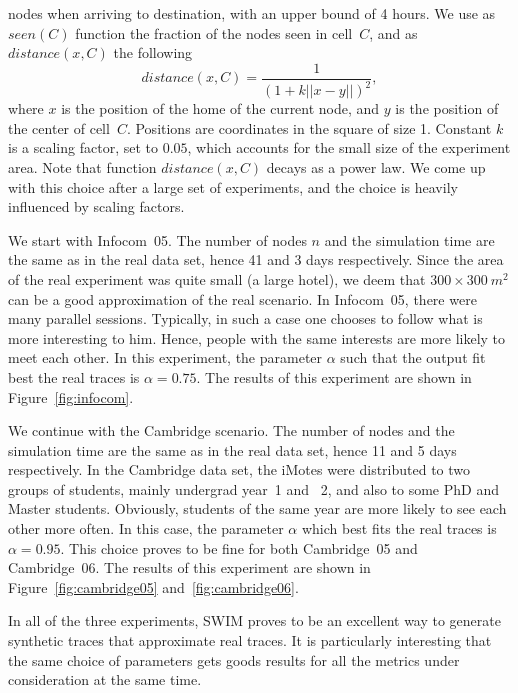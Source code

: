 \documentclass[conference]{IEEEtran}
\begin{document}
nodes when arriving to destination, with an upper bound of 4 hours. We use as
$\textit{seen}(C)$ function the fraction of the nodes seen in cell~$C$, and as
$\textit{distance}(x,C)$ the following
\begin{equation*}
\textit{distance}(x,C)=\frac{1}{\left(1+k||x-y||\right)^2},
\end{equation*}
where $x$ is the position of the home of the current node, and $y$ is the
position of the center of cell~$C$. Positions are coordinates in the square of
size 1. Constant $k$ is a scaling factor, set to $0.05$, which accounts for the
small size of the experiment area. Note that function $\textit{distance}(x,C)$
decays as a power law. We come up with this choice after a large set of
experiments, and the choice is heavily influenced by scaling factors.

We start with Infocom~05. The number of nodes $n$ and the simulation time are
the same as in the real data set, hence 41 and 3 days respectively. Since the
area of the real experiment was quite small (a large hotel), we deem that
$300\times300~m^2$ can be a good approximation of the real scenario. In
Infocom~05, there were many parallel sessions. Typically, in such a case one
chooses to follow what is more interesting to him. Hence, people with the same
interests are more likely to meet each other. In this experiment, the parameter
$\alpha$ such that the output fit best the real traces is $\alpha=0.75$. The
results of this experiment are shown in Figure~\ref{fig:infocom}.

We continue with the Cambridge scenario. The number of nodes and the simulation
time are the same as in the real data set, hence 11 and 5 days respectively. In
the Cambridge data set, the iMotes were distributed to two groups of students,
mainly undergrad year~1 and~ 2, and also to some PhD and Master students.
Obviously, students of the same year are more likely to see each other more
often. In this case, the parameter $\alpha$ which best fits the real traces is
$\alpha=0.95$. This choice proves to be fine for both Cambridge~05 and
Cambridge~06. The results of this experiment are shown in
Figure~\ref{fig:cambridge05} and~\ref{fig:cambridge06}.

In all of the three experiments, SWIM proves to be an excellent way to generate
synthetic traces that approximate real traces. It is particularly interesting
that the same choice of parameters gets goods results for all the metrics under
consideration at the same time.
\end{document}
